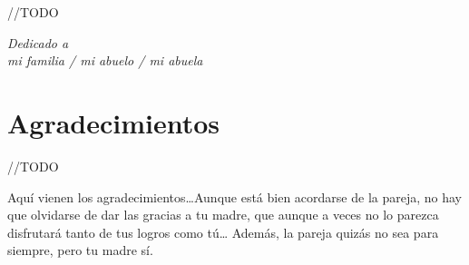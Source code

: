 \chapter*{}
\begin{flushright}

//TODO

\textit{Dedicado a \\
mi familia / mi abuelo / mi abuela}
\end{flushright}


\chapter*{Agradecimientos}

//TODO

Aquí vienen los agradecimientos\ldots Aunque está bien acordarse de la pareja, no hay que olvidarse de dar las gracias a tu madre, que aunque a veces no lo parezca disfrutará tanto de tus logros como tú\ldots 
Además, la pareja quizás no sea para siempre, pero tu madre sí.

